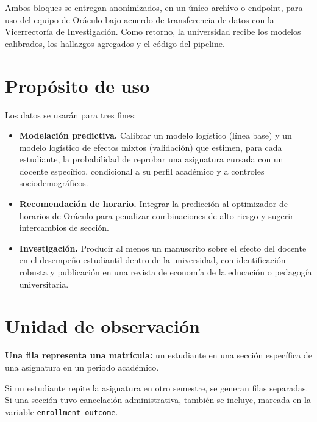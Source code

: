 \documentclass[11pt,a4paper]{article}
\newcommand{\var}[1]{\texttt{\small #1}}
\begin{document}
Ambos bloques se entregan anonimizados, en un único archivo o endpoint, para uso del equipo de Oráculo bajo acuerdo de transferencia de datos con la Vicerrectoría de Investigación. Como retorno, la universidad recibe los modelos calibrados, los hallazgos agregados y el código del pipeline.

\section{Propósito de uso}

Los datos se usarán para tres fines:

\begin{itemize}
\item \textbf{Modelación predictiva.} Calibrar un modelo logístico (línea base) y un modelo logístico de efectos mixtos (validación) que estimen, para cada estudiante, la probabilidad de reprobar una asignatura cursada con un docente específico, condicional a su perfil académico y a controles sociodemográficos.
\item \textbf{Recomendación de horario.} Integrar la predicción al optimizador de horarios de Oráculo para penalizar combinaciones de alto riesgo y sugerir intercambios de sección.
\item \textbf{Investigación.} Producir al menos un manuscrito sobre el efecto del docente en el desempeño estudiantil dentro de la universidad, con identificación robusta y publicación en una revista de economía de la educación o pedagogía universitaria.
\end{itemize}

\section{Unidad de observación}

\textbf{Una fila representa una matrícula:} un estudiante en una sección específica de una asignatura en un periodo académico.

\begin{center}
\end{center}

Si un estudiante repite la asignatura en otro semestre, se generan filas separadas. Si una sección tuvo cancelación administrativa, también se incluye, marcada en la variable \var{enrollment\_outcome}.
\end{document}
